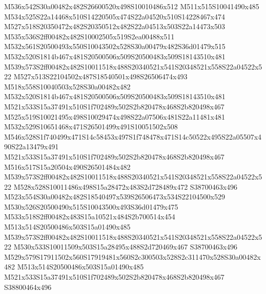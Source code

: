 \documentclass{article}
\begin{document}
\begin{multicols}{2}
M536x542S30a00482x482S26600520x498S10010486x512 M511x515S10041490x485 M534x525S22a14468x510S14220505x474S22a04520x510S14228467x474 M527x518S20350472x482S20350512x482S22a04513x503S22a14473x503 M535x536S2ff00482x482S10002505x519S2ea00488x511 M532x561S20500493x550S10043502x528S30a00479x482S36d01479x515 M532x520S1814b467x481S20500506x509S20500483x509S18143510x481 M539x573S2ff00482x482S10011518x488S20340521x541S20348521x558S22a04522x522 M527x513S22104502x487S18540501x498S26506474x493 M518x558S10040503x528S30a00482x482 M532x520S1814b467x481S20500506x509S20500483x509S18143510x481 M521x533S15a37491x510S1f702489x502S2b820478x468S2b820498x467 M525x519S10021495x498S10029474x498S22a07506x481S22a11481x481 M532x529S10651468x471S26501499x491S10051502x508 M546x528S1f740499x471S14c58453x497S1f748478x471S14c50522x495S22a05507x490S22a13479x491 M521x533S15a37491x510S1f702489x502S2b820478x468S2b820498x467 M516x517S15a20504x490S26501484x482 M539x573S2ff00482x482S10011518x488S20340521x541S20348521x558S22a04522x522 M528x528S10011486x498S15a28472x483S2d728489x472 S38700463x496 M523x554S30a00482x482S18540497x539S26506473x534S22104500x529 M530x526S20500490x515S10043500x493S36d01479x475 M533x518S2ff00482x483S15a10521x484S2b700514x454 M513x514S20500486x503S15a01490x485 M539x573S2ff00482x482S10011518x488S20340521x541S20348521x558S22a04522x522 M530x533S10011509x503S15a28495x488S2d720469x467 S38700463x496 M529x579S17911502x560S17919481x560S2c300503x528S2c311470x528S30a00482x482 M513x514S20500486x503S15a01490x485 M521x533S15a37491x510S1f702489x502S2b820478x468S2b820498x467 S38800464x496








\end{multicols}
\end{document}
